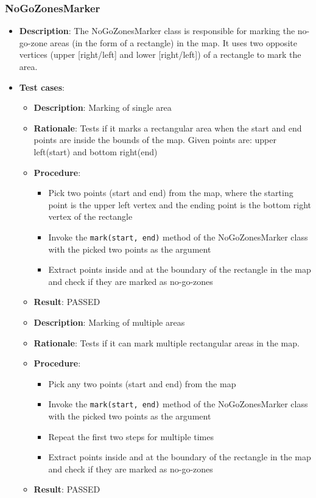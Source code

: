 \documentclass[12pt,a4paper]{article}
\begin{document}
	\subsubsection{NoGoZonesMarker}
	\begin{itemize}
	\item \textbf{Description}:	The NoGoZonesMarker class is responsible for marking the no-go-zone areas (in the form of a rectangle) in the map. It uses two opposite vertices (upper [right/left] and lower [right/left]) of a rectangle to mark the area.
	\item \textbf{Test cases}:
	\begin{itemize}
		\item \textbf{Description}:	Marking of single area
		\item \textbf{Rationale}:	Tests if it marks a rectangular area when the start and end points are inside the bounds of the map. Given points are: upper left(start) and bottom right(end)
		\item \textbf{Procedure}:	
			\begin{itemize}
			\item Pick two points (start and end) from the map, where the starting point is the upper left vertex and the ending point is the bottom right vertex of the rectangle
			\item Invoke the \texttt{mark(start, end)} method of the NoGoZonesMarker class with the picked two points as the argument
			\item Extract points inside and at the boundary of the rectangle in the map and check if they are marked as no-go-zones
		\end{itemize}
		\item \textbf{Result}:		PASSED
	\end{itemize}
	\begin{itemize}
		\item \textbf{Description}:	Marking of multiple areas
		\item \textbf{Rationale}:	Tests if it can mark multiple rectangular areas in the map.
		\item \textbf{Procedure}:	
			\begin{itemize}
			\item Pick any two points (start and end) from the map
			\item Invoke the \texttt{mark(start, end)} method of the NoGoZonesMarker class with the picked two points as the argument
			\item Repeat the first two steps for multiple times
			\item Extract points inside and at the boundary of the rectangle in the map and check if they are marked as no-go-zones
		\end{itemize}
		\item \textbf{Result}:		PASSED
	\end{itemize}
	\end{itemize}
	
\end{document}

